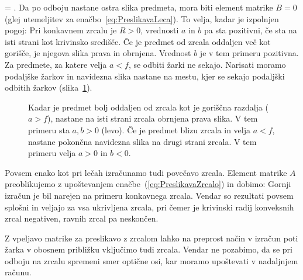 \cdot
\left[\begin{array}{cc}
1& a\\
0&1
\end{array}\right]
= 
\!\!.
\label{eq:02_64}
\eeq
Da po odboju nastane ostra slika predmeta, mora biti element matrike $B=0$ 
(glej utemeljitev za enačbo~\ref{eq:PreslikavaLeca}). To velja, kadar je izpolnjen pogoj:
Pri konkavnem zrcalu je $R>0$, vrednosti $a$ in $b$ pa sta pozitivni, če sta 
na isti strani kot krivinsko središče. Če je predmet od zrcala oddaljen več 
kot gorišče, je njegova slika prava in obrnjena. Vrednost $b$ je v tem primeru pozitivna.
Za predmete, za katere velja $a<f$, se odbiti žarki ne sekajo. Narisati
moramo podaljške žarkov in navidezna slika nastane na mestu, kjer se sekajo podaljški odbitih
žarkov (slika~\ref{fig:02_zrcaloodboj}).
\begin{figure}[!ht]
\centering
\def\svgwidth{140truemm} 

\caption{Kadar je predmet bolj oddaljen od zrcala kot je goriščna razdalja ($a>f$),
nastane na isti strani zrcala obrnjena prava slika. 
V tem primeru sta $a,b>0$ (levo). Če je predmet blizu zrcala in velja $a<f$,
nastane pokončna navidezna slika na drugi strani zrcala. V tem primeru velja $a>0$ in $b<0$.}
\label{fig:02_zrcaloodboj}
\end{figure}

Povsem enako kot pri lečah izračunamo tudi povečavo zrcala. Element matrike $A$
preoblikujemo z upoštevanjem enačbe~(\ref{eq:PreslikavaZrcalo}) in dobimo:
Gornji izračun je bil narejen na primeru konkavnega zrcala. Vendar so rezultati
povsem splošni in veljajo za vsa ukrivljena zrcala, pri čemer
je krivinski radij konveksnih zrcal negativen, ravnih zrcal pa neskončen. 

Z vpeljavo matrike za preslikavo z zrcalom lahko na preprost način v izračun
poti žarka v obosnem približku vključimo tudi zrcala. Vendar ne pozabimo, da se
pri odboju na zrcalu spremeni smer optične osi, kar moramo upoštevati v nadaljnjem računu.

